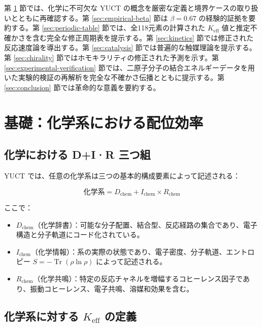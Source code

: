 \documentclass[11pt,a4paper]{article}
\newcommand{\Keff}{K_{\mathrm{eff}}}
\DeclareMathOperator{\Tr}{Tr}
\begin{document}
	第 \ref{sec:foundations} 節では、化学に不可欠な YUCT の概念を厳密な定義と境界ケースの取り扱いとともに再確認する。第 \ref{sec:empirical-beta} 節は $\beta = 0.67$ の経験的証拠を要約する。第 \ref{sec:periodic-table} 節では、全118元素の計算された $\Keff$ 値と推定不確かさを含む完全な修正周期表を提示する。第 \ref{sec:kinetics} 節では修正された反応速度論を導出する。第 \ref{sec:catalysis} 節では普遍的な触媒理論を提示する。第 \ref{sec:chirality} 節ではホモキラリティの修正された予測を示す。第 \ref{sec:experimental-verification} 節では、二原子分子の結合エネルギーデータを用いた実験的検証の再解析を完全な不確かさ伝播とともに提示する。第 \ref{sec:conclusion} 節では革命的な意義を要約する。
	
	\section{基礎：化学系における配位効率}
	\label{sec:foundations}
	
	\subsection{化学における D+I·R 三つ組}
	
	YUCT では、任意の化学系は三つの基本的構成要素によって記述される：
	
	\begin{equation}
		\text{化学系} = D_{\text{chem}} + I_{\text{chem}} \times R_{\text{chem}}
		\label{eq:chem-triad}
	\end{equation}
	
	ここで：
	\begin{itemize}
		\item $D_{\text{chem}}$（化学辞書）：可能な分子配置、結合型、反応経路の集合であり、電子構造と分子軌道にコード化されている。
		\item $I_{\text{chem}}$（化学情報）：系の実際の状態であり、電子密度、分子軌道、エントロピー $S = -\Tr(\rho \ln \rho)$ によって記述される。
		\item $R_{\text{chem}}$（化学共鳴）：特定の反応チャネルを増幅するコヒーレンス因子であり、振動コヒーレンス、電子共鳴、溶媒和効果を含む。
	\end{itemize}
	
	\subsection{化学系に対する $\Keff$ の定義}
	
\end{document}
